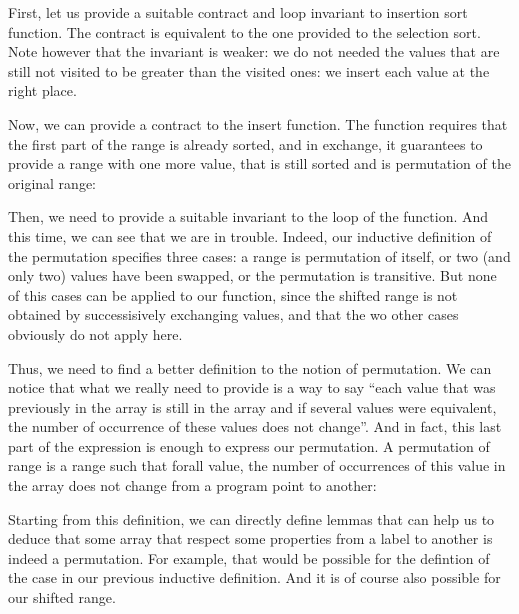 First, let us provide a suitable contract and loop invariant to insertion sort
function. The contract is equivalent to the one provided to the selection sort.
Note however that the invariant is weaker: we do not needed the values that are
still not visited to be greater than the visited ones: we insert each value at
the right place.






Now, we can provide a contract to the insert function. The function requires
that the first part of the range is already sorted, and in exchange, it
guarantees to provide a range with one more value, that is still sorted and
is permutation of the original range:






Then, we need to provide a suitable invariant to the loop of the
 function. And this time, we can see that we are in trouble.
Indeed, our inductive definition of the permutation specifies three cases: a
range is permutation of itself, or two (and only two) values have been swapped,
or the permutation is transitive. But none of this cases can be applied to our 
 function, since the shifted range is not obtained by
successisively exchanging values, and that the wo other cases obviously do not
apply here.



Thus, we need to find a better definition to the notion of permutation. We can
notice that what we really need to provide is a way to say ``each value that
was previously in the array is still in the array and if several values were
equivalent, the number of occurrence of these values does not change''. And in
fact, this last part of the expression is enough to express our permutation.
A permutation of range is a range such that forall value, the number of
occurrences of this value in the array does not change from a program point to
another:






Starting from this definition, we can directly define lemmas that can help us
to deduce that some array that respect some properties from a label to another
is indeed a permutation. For example, that would be possible for the defintion
of the case  in our previous inductive definition. And it is
of course also possible for our shifted range.




